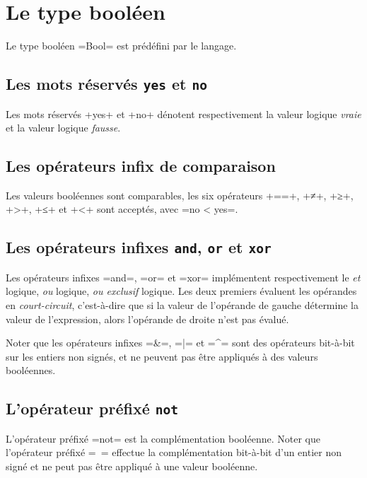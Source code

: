 




\chapter{Le type booléen}


Le type booléen \plm=Bool= est prédéfini par le langage.



\section{Les mots réservés \texttt{yes} et \texttt{no}}

Les mots réservés \plm+yes+ et \plm+no+ dénotent respectivement la valeur logique \emph{vraie} et la valeur logique \emph{fausse}.

\section{Les opérateurs infix de comparaison}

Les valeurs booléennes sont comparables, les six opérateurs \plm+==+, \plm+≠+, \plm+≥+, \plm+>+, \plm+≤+ et \plm+<+ sont acceptés, avec \plm=no < yes=.
 
\section{Les opérateurs infixes \texttt{and}, \texttt{or} et \texttt{xor}}

Les opérateurs infixes \plm=and=, \plm=or= et \plm=xor= implémentent respectivement le \emph{et} logique, \emph{ou} logique, \emph{ou exclusif} logique. Les deux premiers évaluent les opérandes en \emph{court-circuit}, c'est-à-dire que si la valeur de l'opérande de gauche détermine la valeur de l'expression, alors l'opérande de droite n'est pas évalué.

Noter que les opérateurs infixes \plm=&=, \plm=|= et \plm=^= sont des opérateurs bit-à-bit sur les entiers non signés, et ne peuvent pas être appliqués à des valeurs booléennes.


\section{L'opérateur préfixé \texttt{not}}

L'opérateur préfixé \plm=not= est la complémentation booléenne. Noter que l'opérateur préfixé \plm=~= effectue la complémentation bit-à-bit d'un entier non signé et ne peut pas être appliqué à une valeur booléenne.

